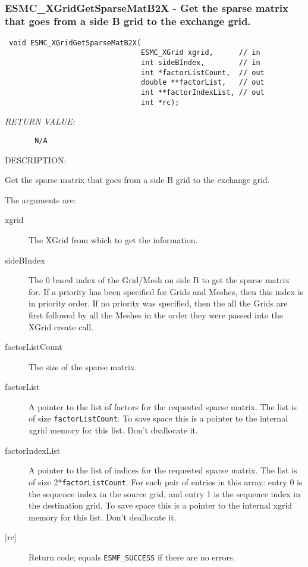  
\mbox{}\hrulefill\ 
 
\subsubsection [ESMC\_XGridGetSparseMatB2X] {ESMC\_XGridGetSparseMatB2X - Get the sparse matrix that goes from a side B grid to the exchange grid.}


 
  
\begin{verbatim} void ESMC_XGridGetSparseMatB2X(
                                ESMC_XGrid xgrid,      // in
                                int sideBIndex,        // in
                                int *factorListCount,  // out
                                double **factorList,   // out
                                int **factorIndexList, // out
                                int *rc);
 \end{verbatim}{\em RETURN VALUE:}
\begin{verbatim}       N/A\end{verbatim}
{\sf DESCRIPTION:\\ }


   
      Get the sparse matrix that goes from a side B grid to the exchange grid.
  
    The arguments are:
    \begin{description}
    \item[xgrid]
      The XGrid from which to get the information.
    \item[sideBIndex]
      The 0 based index of the Grid/Mesh on side B to get the sparse matrix for.
      If a priority has been specified for Grids and Meshes, then this index is 
      in priority order. If no priority was specified, then the all the Grids are
      first followed by all the Meshes in the order they were passed into the XGrid 
      create call. 
    \item[factorListCount]
      The size of the sparse matrix.
    \item[factorList]
      A pointer to the list of factors for the requested sparse matrix. 
      The list is of size {\tt factorListCount}. To save space
      this is a pointer to the internal xgrid memory for this list. 
      Don't deallocate it. 
    \item[factorIndexList]
      A pointer to the list of indices for the requested sparse matrix. 
      The list is of size 2*{\tt factorListCount}. For each pair of entries
      in this array: entry 0 is the sequence index in the source grid, and entry 1 is
      the sequence index in the destination grid. To save space
      this is a pointer to the internal xgrid memory for this list. 
      Don't deallocate it. 
    \item[{[rc]}]
      Return code; equals {\tt ESMF\_SUCCESS} if there are no errors.
    \end{description}
   
